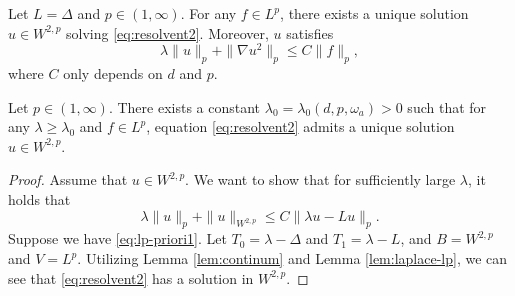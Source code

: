 \begin{lemma}\label{lem:laplace-lp}
    Let $L=\Delta$ and $p\in (1,\infty)$. For any $f\in L^p$, there exists a unique solution $u\in W^{2,p}$ solving \eqref{eq:resolvent2}. Moreover, $u$ satisfies \begin{equation}
        \lambda \|u\|_p+\|\nabla u^2\|_{p}\leq C \|f\|_p,  
    \end{equation}
    where $C$ only depends on $d$ and $p$.  
\end{lemma}	
\begin{theorem}
    Let $p\in (1,\infty)$.  There exists a constant $\lambda_0=\lambda_0(d, p, \omega_a)>0$ such that  for any $\lambda\geq \lambda_0$ and $f\in L^p$, equation  \eqref{eq:resolvent2} admits  a unique solution $u\in W^{2,p}$. 
\end{theorem}
\begin{proof}
    Assume that $u\in W^{2,p}$. We want to show that for sufficiently large $\lambda$, it holds that 
    \begin{equation}\label{eq:lp-priori1}
        \lambda \|u\|_p+\|u\|_{W^{2,p}} \leq C \|\lambda u- L u\|_p. 
    \end{equation}
    Suppose we have \eqref{eq:lp-priori1}. Let $T_0=\lambda - \Delta$ and $T_1=\lambda - L$, and $B=W^{2,p}$ and $V=L^p$. Utilizing Lemma \ref{lem:continum} and Lemma \ref{lem:laplace-lp}, we can see that \eqref{eq:resolvent2} has a solution in $W^{2,p}$. 
    

\end{proof}
